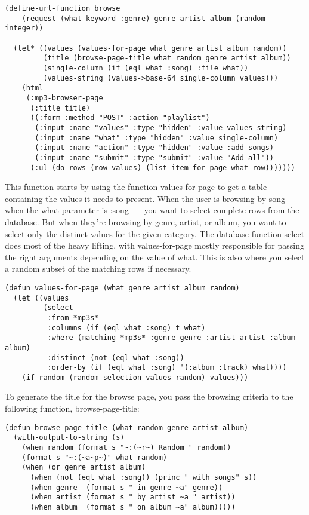 \begin{lstlisting}
(define-url-function browse
    (request (what keyword :genre) genre artist album (random integer))

  (let* ((values (values-for-page what genre artist album random))
         (title (browse-page-title what random genre artist album))
         (single-column (if (eql what :song) :file what))
         (values-string (values->base-64 single-column values)))
    (html
     (:mp3-browser-page
      (:title title)
      ((:form :method "POST" :action "playlist")
       (:input :name "values" :type "hidden" :value values-string)
       (:input :name "what" :type "hidden" :value single-column)
       (:input :name "action" :type "hidden" :value :add-songs)
       (:input :name "submit" :type "submit" :value "Add all"))
      (:ul (do-rows (row values) (list-item-for-page what row)))))))
\end{lstlisting}

This function starts by using the function values-for-page to get a table containing the
values it needs to present. When the user is browsing by song~--- when the what parameter is
:song~--- you want to select complete rows from the database. But when they're browsing by
genre, artist, or album, you want to select only the distinct values for the given
category. The database function select does most of the heavy lifting, with
values-for-page mostly responsible for passing the right arguments depending on the value
of what. This is also where you select a random subset of the matching rows if necessary.

\begin{lstlisting}
(defun values-for-page (what genre artist album random)
  (let ((values
         (select 
          :from *mp3s*
          :columns (if (eql what :song) t what)
          :where (matching *mp3s* :genre genre :artist artist :album album)
          :distinct (not (eql what :song))
          :order-by (if (eql what :song) '(:album :track) what))))
    (if random (random-selection values random) values)))
\end{lstlisting}

To generate the title for the browse page, you pass the browsing criteria to the following
function, browse-page-title:

\begin{lstlisting}
(defun browse-page-title (what random genre artist album)
  (with-output-to-string (s)
    (when random (format s "~:(~r~) Random " random))
    (format s "~:(~a~p~)" what random)
    (when (or genre artist album)
      (when (not (eql what :song)) (princ " with songs" s))
      (when genre  (format s " in genre ~a" genre))
      (when artist (format s " by artist ~a " artist))
      (when album  (format s " on album ~a" album)))))
\end{lstlisting}

